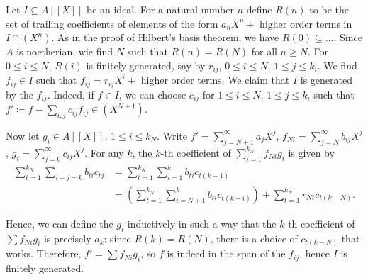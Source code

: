 Let $I \subseteq A[[X]]$ be an ideal. For a natural number $n$ define $R(n)$
to be the set of trailing coefficients of elements of the form
$a_nX^n +$ higher order terms in $I\cap (X^n)$. As in the proof of
Hilbert's basis theorem, we have $R(0) \subseteq \ldots$. Since $A$ is
noetherian, wie find $N$ such that $R(n) = R(N)$ for all $n \geq N$.
For $0 \leq i \leq N$, $R(i)$ is finitely generated, say by
$r_{ij}$, $0\leq i\leq N$, $1\leq j\leq k_i$. We find $f_{ij} \in I$ such that
$f_{ij} = r_{ij}X^i +$ higher order terms. We claim that $I$ is generated
by the $f_{ij}$. Indeed, if $f \in I$, we can choose $c_{ij}$ for $1\leq i\leq N$,
$1\leq j\leq k_i$ such that $f'\coloneqq f - \sum_{i, j} c_{ij} f_{ij} \in (X^{N+1})$.

Now let $g_i \in A[[X]]$, $1\leq i\leq k_N$. Write $f' = \sum_{j = N+1}^\infty a_jX^j$,
$f_{Ni} = \sum_{j = N}^\infty b_{ij}X^j$, $g_i = \sum_{j = 0}^\infty c_{ij}X^j$.
For any $k$, the $k$-th coefficient of $\sum_{i=1}^{k_N} f_{Ni}g_i$ is given by
\begin{align*}
	\sum_{t = 1}^{k_N}\sum_{i+j = k}b_{ti}c_{tj}&= \sum_{t=1}^{k_N}\sum_{i = 1}^kb_{ti}c_{t(k-1)}\\
	&= \left(\sum_{t=1}^{k_N}\sum_{i = N+1}^kb_{ti}c_{t(k-i)}\right)+\sum_{t=1}^{k_N}r_{Nt}c_{t(k-N)}.
\end{align*}

Hence, we can define the $g_i$ inductively in such a way that the
$k$-th coefficient of $\sum f_{Ni}g_i$ is precisely $a_k$: since $R(k) = R(N)$,
there is a choice of $c_{t(k-N)}$ that works.
Therefore, $f' = \sum f_{Ni}g_i$, so $f$ is indeed in the span of the
$f_{ij}$, hence $I$ is finitely generated.
